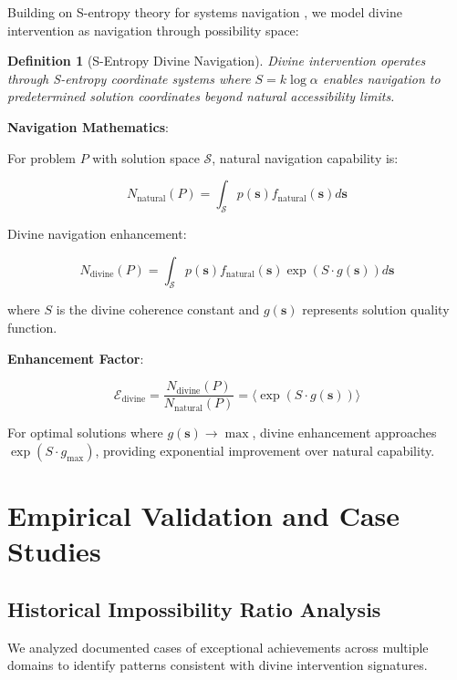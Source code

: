 \documentclass[12pt,a4paper]{article}
\newtheorem{definition}[theorem]{Definition}
\begin{document}
Building on S-entropy theory for systems navigation \citep{sachikonye2024sentropy}, we model divine intervention as navigation through possibility space:

\begin{definition}[S-Entropy Divine Navigation]
Divine intervention operates through S-entropy coordinate systems where $S = k \log \alpha$ enables navigation to predetermined solution coordinates beyond natural accessibility limits.
\end{definition}

\textbf{Navigation Mathematics}:

For problem $P$ with solution space $\mathcal{S}$, natural navigation capability is:

$$N_{\text{natural}}(P) = \int_{\mathcal{S}} p(\mathbf{s}) f_{\text{natural}}(\mathbf{s}) d\mathbf{s}$$

Divine navigation enhancement:

$$N_{\text{divine}}(P) = \int_{\mathcal{S}} p(\mathbf{s}) f_{\text{natural}}(\mathbf{s}) \exp(S \cdot g(\mathbf{s})) d\mathbf{s}$$

where $S$ is the divine coherence constant and $g(\mathbf{s})$ represents solution quality function.

\textbf{Enhancement Factor}:

$$\mathcal{E}_{\text{divine}} = \frac{N_{\text{divine}}(P)}{N_{\text{natural}}(P)} = \langle \exp(S \cdot g(\mathbf{s})) \rangle$$

For optimal solutions where $g(\mathbf{s}) \to \max$, divine enhancement approaches $\exp(S \cdot g_{\max})$, providing exponential improvement over natural capability.

\section{Empirical Validation and Case Studies}

\subsection{Historical Impossibility Ratio Analysis}

We analyzed documented cases of exceptional achievements across multiple domains to identify patterns consistent with divine intervention signatures.
\end{document}
